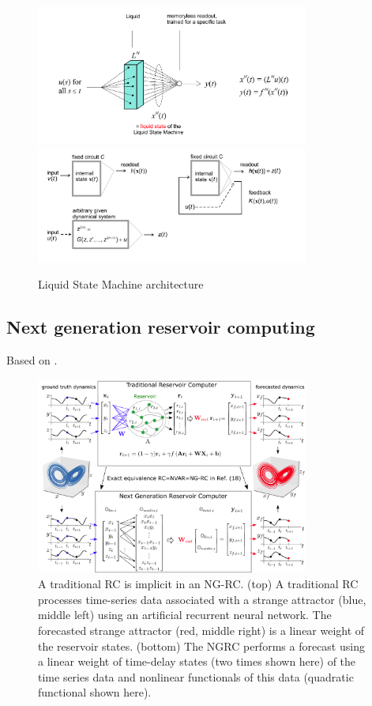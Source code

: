 \documentclass[11pt, oneside]{article}
\begin{document}
\begin{figure}
    \centering
    \includegraphics[width=0.8\textwidth]{figs/Liquid-state.png}
    \includegraphics[width=0.8\textwidth]{figs/liquid-state-2.png}

    \caption{Liquid State Machine architecture}
    \label{fig:lsm}
\end{figure}

\subsection{Next generation reservoir computing}
Based on \autocite{Gauthier2021}.

\begin{figure}[H]
    \centering
    \includegraphics[width=0.8\textwidth]{figs/next-generation.png}
    \caption{ A traditional RC is implicit in an NG-RC. (top) A traditional RC processes time-series data associated with a strange attractor (blue, middle left)
        using an artificial recurrent neural network. The forecasted strange attractor (red, middle right) is a linear weight of the reservoir states. (bottom) The NGRC performs a forecast using a linear weight of time-delay states (two times shown here) of the time series data and nonlinear functionals of this data
        (quadratic functional shown here).}
    \label{fig:ng-rc}
\end{figure}
\end{document}
